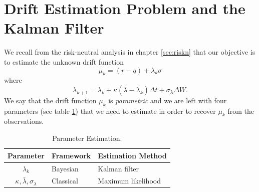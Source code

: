 \documentclass{article}
\theoremstyle{definition}
\theoremstyle{remark}
\newtheorem{remark}[thm]{Remark}
\begin{document}












\newpage
\section{Drift Estimation Problem and the Kalman Filter}\label{sec:app}
We recall from the risk-neutral analysis in chapter \ref{sec:riskn} that our objective is to estimate the unknown drift function
\begin{equation}
\mu_k=(r-q)+\lambda_k\sigma
\end{equation}
where
\begin{equation}
\lambda_{k+1} = \lambda_k + \kappa(\bar{\lambda}-\lambda_k)\Delta t +\sigma_\lambda \Delta W.
\end{equation}
We say that the drift function $\mu_k$ is \emph{parametric} and we are left with four parameters (see table \ref{table:params}) that we need to estimate in order to recover $\mu_k$ from the observations.
\begin{table}[h!]
  \begin{center}
    \begin{tabular}{ c p{3cm} p{5cm} }
    \hline
		Parameter & Framework & Estimation Method\\ \hline
		$\lambda_k$ & Bayesian & Kalman filter\\
		$\kappa,\bar{\lambda},\sigma_\lambda$ & Classical & Maximum likelihood\\ %
    \hline
    \end{tabular}
  \end{center}
  \caption{Parameter Estimation.}\label{table:params}
\end{table}
\end{document}
